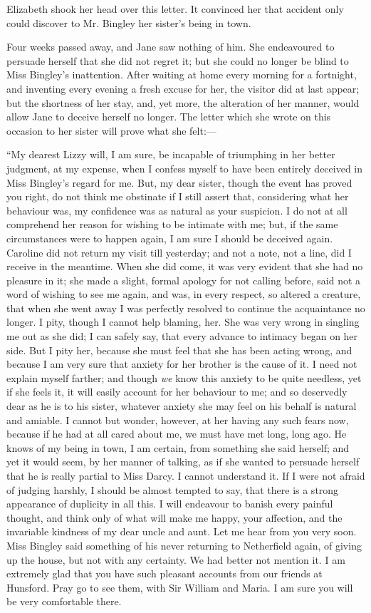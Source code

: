Elizabeth shook her head over this letter. It convinced her that accident only could discover to Mr. Bingley her sister's being in town.

Four weeks passed away, and Jane saw nothing of him. She endeavoured to persuade herself that she did not regret it; but she could no longer be blind to Miss Bingley's inattention. After waiting at home every morning for a fortnight, and inventing every evening a fresh excuse for her, the visitor did at last appear; but the shortness of her stay, and, yet more, the alteration of her manner, would allow Jane to deceive herself no longer. The letter which she wrote on this occasion to her sister will prove what she felt:---

``My dearest Lizzy will, I am sure, be incapable of triumphing in her better judgment, at my expense, when I confess myself to have been entirely deceived in Miss Bingley's regard for me. But, my dear sister, though the event has proved you right, do not think me obstinate if I still assert that, considering what her behaviour was, my confidence was as natural as your suspicion. I do not at all comprehend her reason for wishing to be intimate with me; but, if the same circumstances were to happen again, I am sure I should be deceived again. Caroline did not return my visit till yesterday; and not a note, not a line, did I receive in the meantime. When she did come, it was very evident that she had no pleasure in it; she made a slight, formal apology for not calling before, said not a word of wishing to see me again, and was, in every respect, so altered a creature, that when she went away I was perfectly resolved to continue the acquaintance no longer. I pity, though I cannot help blaming, her. She was very wrong in singling me out as she did; I can safely say, that every advance to intimacy began on her side. But I pity her, because she must feel that she has been acting wrong, and because I am very sure that anxiety for her brother is the cause of it. I need not explain myself farther; and though \textit{we} know this anxiety to be quite needless, yet if she feels it, it will easily account for her behaviour to me; and so deservedly dear as he is to his sister, whatever anxiety she may feel on his behalf is natural and amiable. I cannot but wonder, however, at her having any such fears now, because if he had at all cared about me, we must have met long, long ago. He knows of my being in town, I am certain, from something she said herself; and yet it would seem, by her manner of talking, as if she wanted to persuade herself that he is really partial to Miss Darcy. I cannot understand it. If I were not afraid of judging harshly, I should be almost tempted to say, that there is a strong appearance of duplicity in all this. I will endeavour to banish every painful thought, and think only of what will make me happy, your affection, and the invariable kindness of my dear uncle and aunt. Let me hear from you very soon. Miss Bingley said something of his never returning to Netherfield again, of giving up the house, but not with any certainty. We had better not mention it. I am extremely glad that you have such pleasant accounts from our friends at Hunsford. Pray go to see them, with Sir William and Maria. I am sure you will be very comfortable there.


